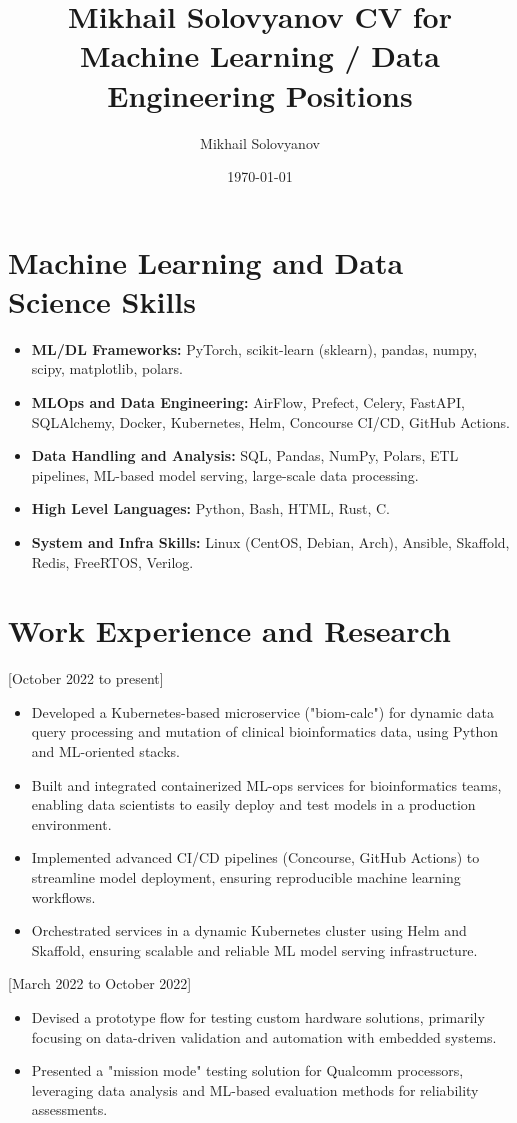 \documentclass{article}
\title{ Mikhail Solovyanov CV for Machine Learning / Data Engineering Positions}
\author{Mikhail Solovyanov}
\date{\today}
\begin{document}
\makecvtitle

\section{Machine Learning and Data Science Skills}

\begin{itemize}
   \item \textbf{ML/DL Frameworks:} PyTorch, scikit-learn (sklearn), pandas, numpy, scipy, matplotlib, polars.
   \item \textbf{MLOps and Data Engineering:} AirFlow, Prefect, Celery, FastAPI, SQLAlchemy, Docker, Kubernetes, Helm, Concourse CI/CD, GitHub Actions.
   \item \textbf{Data Handling and Analysis:} SQL, Pandas, NumPy, Polars, ETL pipelines, ML-based model serving, large-scale data processing.
   \item \textbf{High Level Languages:} Python, Bash, HTML, Rust, C.
   \item \textbf{System and Infra Skills:} Linux (CentOS, Debian, Arch), Ansible, Skaffold, Redis, FreeRTOS, Verilog.
\end{itemize}

\section{Work Experience and Research}

[October 2022 to present]
\begin{itemize}
   \item Developed a Kubernetes-based microservice ("biom-calc") for dynamic data query processing and mutation of clinical bioinformatics data, using Python and ML-oriented stacks.
   \item Built and integrated containerized ML-ops services for bioinformatics teams, enabling data scientists to easily deploy and test models in a production environment.
   \item Implemented advanced CI/CD pipelines (Concourse, GitHub Actions) to streamline model deployment, ensuring reproducible machine learning workflows.
   \item Orchestrated services in a dynamic Kubernetes cluster using Helm and Skaffold, ensuring scalable and reliable ML model serving infrastructure.
\end{itemize}

[March 2022 to October 2022]
\begin{itemize}
   \item Devised a prototype flow for testing custom hardware solutions, primarily focusing on data-driven validation and automation with embedded systems.
   \item Presented a "mission mode" testing solution for Qualcomm processors, leveraging data analysis and ML-based evaluation methods for reliability assessments.
\end{itemize}
\end{document}
